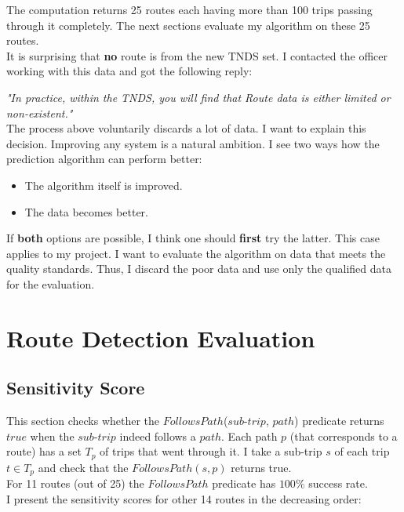\documentclass[12pt,a4paper,oneside,openright]{report}
\begin{document}
The computation returns 25 routes each having more than 100 trips passing through it completely. The next
sections evaluate my algorithm on these 25 routes. \\

It is surprising that \textbf{no} route is from the new TNDS set. I contacted the officer
working with this data and got the following reply:

\textit{"In practice, within the TNDS, you will find that Route data is either limited or
non-existent."} \\

The process above voluntarily discards a lot of data. I want to explain this decision.
Improving any system is a natural ambition. I see two ways how the prediction algorithm can
perform better:

\begin{itemize} 
\item The algorithm itself is improved.
\item The data becomes better.
\end{itemize}

If \textbf{both} options are possible, I think one should \textbf{first} try the latter.
This case applies to my project. I want to evaluate the algorithm on data that meets
the quality standards. Thus, I discard the poor data and use only the qualified data for the
evaluation. \\


\section{Route Detection Evaluation}

\subsection{Sensitivity Score}

This section checks whether the $FollowsPath$($sub$-$trip$, $path$) predicate returns $true$
when the $sub$-$trip$ indeed follows a $path$. Each path $p$ (that corresponds to a route)
has a set $T_p$ of trips that went through it. I take a sub-trip $s$ of each trip $t \in T_p$
and check that the $FollowsPath(s, p)$ returns true. \\

For 11 routes (out of 25) the $FollowsPath$ predicate has $100\%$ success rate. \\

I present the sensitivity scores for other 14 routes in the decreasing order:
\end{document}
